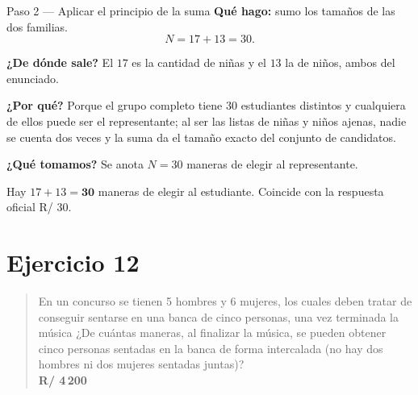 \documentclass[11pt]{article}
\begin{document}
\begin{paso}{Paso 2 --- Aplicar el principio de la suma}
\textbf{Qué hago:} sumo los tamaños de las dos familias.
\[
  N = 17+13 = 30 .
\]

\textbf{¿De dónde sale?} El $17$ es la cantidad de niñas y el $13$ la de niños, ambos del enunciado.

\textbf{¿Por qué?} Porque el grupo completo tiene $30$ estudiantes distintos y cualquiera de ellos puede ser el representante; al ser las listas de niñas y niños ajenas, nadie se cuenta dos veces y la suma da el tamaño exacto del conjunto de candidatos.

\textbf{¿Qué tomamos?} Se anota $N=30$ maneras de elegir al representante.
\end{paso}

\begin{resp}
Hay $17+13=\mathbf{30}$ maneras de elegir al estudiante. Coincide con la respuesta oficial R/ 30.
\end{resp}

\section*{Ejercicio 12}

\begin{quote}
En un concurso se tienen 5 hombres y 6 mujeres, los cuales deben tratar de conseguir sentarse en una banca de cinco personas, una vez terminada la música ¿De cuántas maneras, al finalizar la música, se pueden obtener cinco personas sentadas en la banca de forma intercalada (no hay dos hombres ni dos mujeres sentadas juntas)?\\[2pt]
\textbf{R/ 4\,200}
\end{quote}
\end{document}
